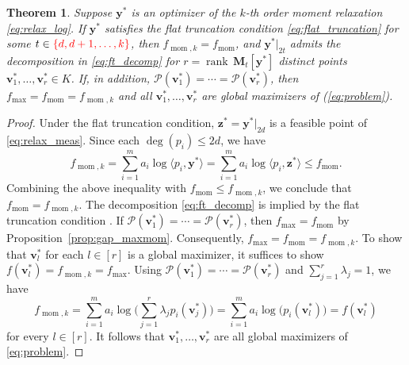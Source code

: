 \documentclass[pdflatex,sn-mathphys-num]{sn-jnl}%
\DeclareMathOperator{\rank}{rank}
\newcommand{\reff}[1]{(\ref{#1})}
\newcommand{\rd}[1]{{\color{red}#1}}
\newcommand{\vect}[1]{\boldsymbol{#1}}
\newcommand{\mat}[1]{\boldsymbol{#1}}
\newcommand{\ddd}{,\ldots,}
\theoremstyle{thmstyleone}%
\newtheorem{theorem}{Theorem}%
\theoremstyle{thmstyletwo}%
\theoremstyle{thmstylethree}%
\begin{document}
\begin{theorem}\label{tm:parallel_all}
	Suppose $\vect{y}^*$ is an optimizer of the $k$-th order moment relaxation \eqref{eq:relax_log}.
	If $\vect{y}^*$ satisfies the flat truncation condition 
	\eqref{eq:flat_truncation} for some
	$t\in\rd{\{d,d+1,\ldots,k\}}$,
	then $f_{\operatorname{mom},k} = f_{\operatorname{mom}}$,
	and $\vect{y}^*|_{2t}$ admits the decomposition in \eqref{eq:ft_decomp} 
	for $r=\rank\, \mat{M}_t[\vect{y}^*]$ distinct points $\vect{v}_1^*,\ldots, \vect{v}_r^*\in K$.
	If, in addition,
$\mathcal{P}(\vect{v}_1^*)=\cdots=\mathcal{P}(\vect{v}_r^*)$,
	then $f_{\max} = f_{\operatorname{mom}} = f_{\operatorname{mom},k}$
	and all $\vect{v}_1^* \ddd \vect{v}_r^*$ are global maximizers of \reff{eq:problem}.
\end{theorem}

\begin{proof} 
	Under the flat truncation condition, 
	$\vect{z}^* = \vect{y}^*|_{2d}$ is a feasible point of \eqref{eq:relax_meas}.
	Since each $\deg(p_i) \le 2d$, we have
	\begin{equation}
		f_{\operatorname{mom},k} = \sum_{i=1}^m a_i \log \langle p_i,\vect{y}^*\rangle 
		= \sum_{i=1}^m a_i \log \langle p_i,\vect{z}^*\rangle 
		\leq f_{\operatorname{mom}}.
	\end{equation}
	\rd{Combining} the above inequality with
	$f_{\operatorname{mom}} \le f_{\operatorname{mom},k}$,
	we conclude that $f_{\operatorname{mom}} = f_{\operatorname{mom},k}$.
	The decomposition \eqref{eq:ft_decomp} is implied by the 
	flat truncation condition \cite[Theorem~2.7.7]{MPO}.
	If
$\mathcal{P}(\vect{v}_1^*)=\cdots=\mathcal{P}(\vect{v}_r^*)$,
	then $f_{\max} = f_{\operatorname{mom}}$ by Proposition~\ref{prop:gap_maxmom}.
	Consequently, $f_{\max} = f_{\operatorname{mom}} = f_{\operatorname{mom},k}$.
	To show that $\vect{v}_l^*$ for each $l\in[r]$ is a global maximizer, 
	it suffices to show $f(\vect{v}_l^*) = f_{\operatorname{mom},k} = f_{\max}$.
	\rd{Using
	$\mathcal{P}(\vect{v}_1^*)=\cdots=\mathcal{P}(\vect{v}_r^*)$
	and $\sum_{j=1}^r\lambda_j=1$,} we have
	\begin{equation*}
		f_{\operatorname{mom},k}
		= \sum_{i=1}^m a_i \log \Big( \sum_{j=1}^r \lambda_j p_i(\vect{v}_j^*) \Big) 
		= \sum_{i=1}^m a_i \log \big( p_i(\vect{v}_l^*) \big) = f(\vect{v}_l^*)
	\end{equation*}
	for every $l\in[r]$. It follows that $\vect{v}_1^*, \ldots, \vect{v}_r^*$ 
	are all global maximizers of \eqref{eq:problem}. 
\end{proof}
\end{document}
